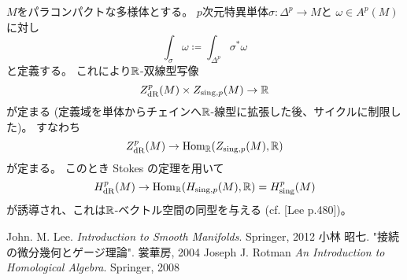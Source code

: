 \documentclass[report]{jlreq}
\begin{document}
\begin{remark}
    $M$をパラコンパクトな多様体とする。
    $p$次元{\smooth}特異単体$\sigma \colon \Delta^p \to M$と
    $\omega \in A^p(M)$に対し
    \begin{equation}
        \int_{\sigma} \omega \coloneqq \int_{\Delta^p} \sigma^* \omega
    \end{equation}
    と定義する。
    これにより$\mathbb{R}$-双線型写像
    \begin{equation}
        Z_{\mathrm{dR}}^p(M) \times Z_{\mathrm{sing}, p}(M) \to \mathbb{R}
    \end{equation}
    が定まる (定義域を単体からチェインへ$\mathbb{R}$-線型に拡張した後、サイクルに制限した)。
    すなわち
    \begin{equation}
        Z_{\mathrm{dR}}^p(M) \to \operatorname{Hom}_{\mathbb{R}}(Z_{\mathrm{sing}, p}(M), \mathbb{R})
    \end{equation}
    が定まる。
    このとき Stokes の定理を用いて
    \begin{equation}
        H_{\mathrm{dR}}^p(M)
            \to \operatorname{Hom}_{\mathbb{R}}(H_{\mathrm{sing}, p}(M), \mathbb{R})
            = H_{\mathrm{sing}}^p(M)
    \end{equation}
    が誘導され、これは$\mathbb{R}$-ベクトル空間の同型を与える (cf. [Lee p.480])。
\end{remark}

\newpage
{}
{}
\renewcommand{\bibname}{参考文献}
\markboth{\bibname}{}
\begin{thebibliography}{9}
     John. M. Lee. \textit{Introduction to Smooth Manifolds}. Springer, 2012
     小林 昭七. "接続の微分幾何とゲージ理論". 裳華房, 2004
     Joseph J. Rotman \textit{An Introduction to Homological Algebra}. Springer, 2008
\end{thebibliography}
\end{document}
